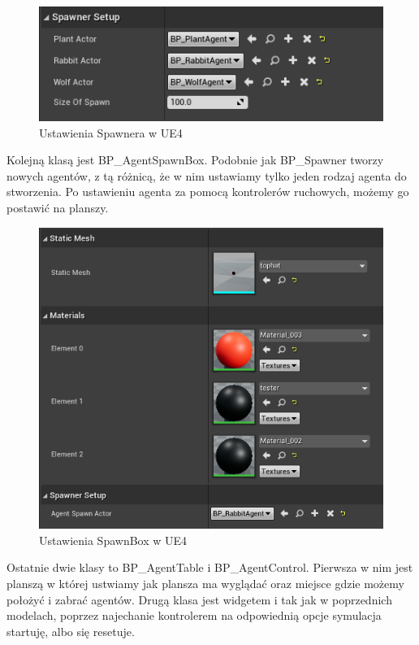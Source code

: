 \documentclass[a4paper,12pt,reqno]{article}
\begin{document}
\begin{figure}[H]%
\centering
\includegraphics[width=0.6\columnwidth]{graphics//agent/BP_SpawnerAgent.png}
\caption{Ustawienia Spawnera w UE4 
\label{BPExample}}%
%
\qquad
\end{figure} 

Kolejną klasą jest BP\_AgentSpawnBox. Podobnie jak BP\_Spawner tworzy nowych agentów, z tą różnicą, że w nim ustawiamy tylko jeden rodzaj agenta do stworzenia. Po ustawieniu agenta za pomocą kontrolerów ruchowych, możemy go postawić na planszy.

\begin{figure}[H]%
\centering
\includegraphics[width=0.6\columnwidth]{graphics//agent/BP_AgentSpawnBox.png}
\caption{Ustawienia SpawnBox w UE4 
\label{BPExample}}%
%
\qquad
\end{figure} 

Ostatnie dwie klasy to BP\_AgentTable i BP\_AgentControl. Pierwsza w nim jest planszą w której ustwiamy jak plansza ma wyglądać oraz miejsce gdzie możemy położyć i zabrać agentów. Drugą klasa jest widgetem i tak jak w poprzednich modelach, poprzez najechanie kontrolerem na odpowiednią opcje symulacja startuję, albo się resetuje.
\end{document}
